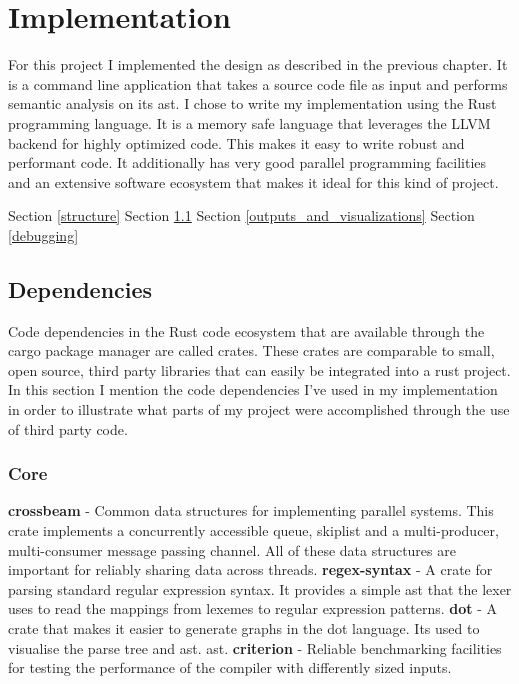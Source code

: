 \chapter{Implementation} \label{implementation}

For this project I implemented the design as described in the previous chapter.
It is a command line application that takes a source code file as input and
performs semantic analysis on its \gls{ast}. I chose to write my implementation
using the Rust programming language. It is a memory safe language that leverages
the LLVM backend for highly optimized code. This makes it easy to write
robust and performant code. It additionally has very good parallel programming
facilities and an extensive software ecosystem that makes it ideal for this kind
of project. 

Section \ref{structure}
\newline \newline
Section \ref{dependancies}
\newline \newline
Section \ref{outputs_and_visualizations}
\newline \newline
Section \ref{debugging}

\section{Dependencies} \label{dependancies}

Code dependencies in the Rust code ecosystem that are  available through the
cargo package manager are called crates. These crates are comparable to small,
open source, third party libraries that can easily be integrated into a rust
project. In this section I mention the code dependencies I've used in my
implementation in order to illustrate what parts of my project were accomplished
through the use of third party code.

\subsection{Core}

\textbf{crossbeam} - Common data structures for implementing parallel systems.
This crate implements a concurrently accessible queue, skiplist and a
multi-producer, multi-consumer message passing channel. All of these data
structures are important for reliably sharing data across threads.
\newline\newline
\textbf{regex-syntax} - A crate for parsing standard regular expression syntax.
It provides a simple \gls{ast} that the lexer uses to read the mappings from
lexemes to regular expression patterns.
\newline\newline
\textbf{dot} - A crate that makes it easier to generate graphs in the dot
language. Its used to visualise the parse tree and \gls{ast}.
\gls{ast}.
\newline\newline
\textbf{criterion} - Reliable benchmarking facilities for testing the performance of the
compiler with differently sized inputs.

